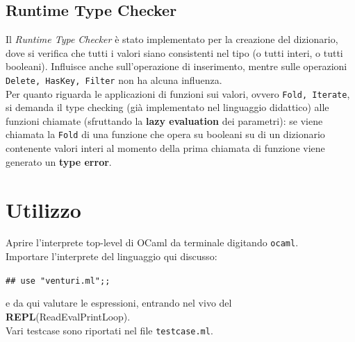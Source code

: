 \documentclass[10pt, a4paper]{article}
\begin{document}
\subsection{Runtime Type Checker}
Il \textit{Runtime Type Checker} è stato implementato per la creazione del dizionario, dove si verifica che tutti i valori siano consistenti nel tipo (o tutti interi, o tutti booleani). Influisce anche sull'operazione di inserimento, mentre sulle operazioni \texttt{Delete, HasKey, Filter} non ha alcuna influenza.\\ 
Per quanto riguarda le applicazioni di funzioni sui valori, ovvero \texttt{Fold, Iterate}, si demanda il type checking (già implementato nel linguaggio didattico) alle funzioni chiamate (sfruttando la \textbf{lazy evaluation} dei parametri): se viene chiamata la \texttt{Fold} di una funzione che opera su booleani su di un dizionario contenente valori interi al momento della prima chiamata di funzione viene generato un \textbf{type error}.
\section{Utilizzo}
Aprire l'interprete top-level di OCaml da terminale digitando \texttt{ocaml}.\\ Importare l'interprete del linguaggio qui discusso:
\begin{center}
\texttt{\emph{\#}\# use "venturi.ml";;}
\end{center}
e da qui valutare le espressioni, entrando nel vivo del \textbf{REPL}(ReadEvalPrintLoop).\\Vari testcase sono riportati nel file \texttt{testcase.ml}. \clearpage
\end{document}
